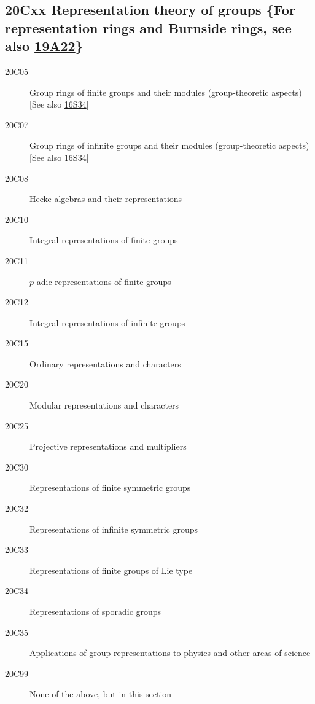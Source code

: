 \subsection*{20Cxx  Representation theory of groups \{For representation rings and Burnside rings, see also \hyperref[19A22]{19A22}\} }\label{20Cxx}
\begin{description}  
\item [20C05]\label{20C05} Group rings of finite groups and their modules (group-theoretic aspects) [See also \hyperref[16S34]{16S34}]
\item [20C07]\label{20C07} Group rings of infinite groups and their modules (group-theoretic aspects) [See also \hyperref[16S34]{16S34}]
\item [20C08]\label{20C08} Hecke algebras and their representations
\item [20C10]\label{20C10} Integral representations of finite groups
\item [20C11]\label{20C11} $p$-adic representations of finite groups
\item [20C12]\label{20C12} Integral representations of infinite groups
\item [20C15]\label{20C15} Ordinary representations and characters
\item [20C20]\label{20C20} Modular representations and characters
\item [20C25]\label{20C25} Projective representations and multipliers
\item [20C30]\label{20C30} Representations of finite symmetric groups
\item [20C32]\label{20C32} Representations of infinite symmetric groups
\item [20C33]\label{20C33} Representations of finite groups of Lie type
\item [20C34]\label{20C34} Representations of sporadic groups
\item [20C35]\label{20C35} Applications of group representations to physics and other areas of science
\item [20C99]\label{20C99} None of the above, but in this section
\end{description}
